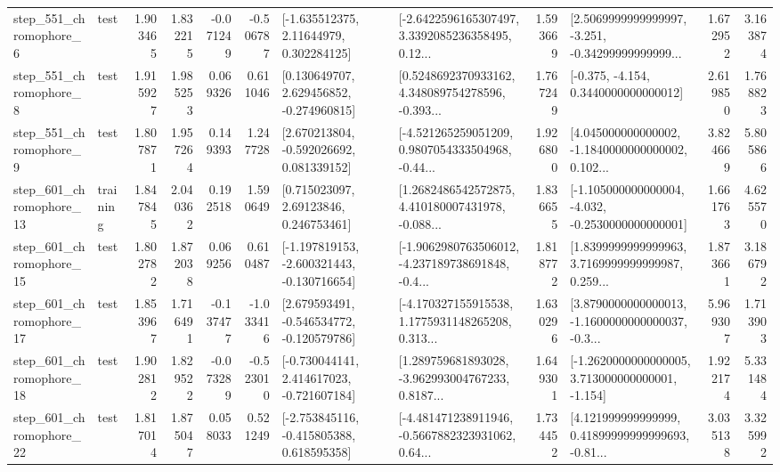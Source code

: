 \begin{tabular}{llrrrrllrlrr}
   step\_551\_chromophore\_6 &      test &      1.903465 &    1.832215 &     -0.071249 & -0.506787 &     [-1.635512375, 2.11644979, 0.302284125] &  [-2.6422596165307497, 3.3392085236358495, 0.12... &       1.593669 &  [2.5069999999999997, -3.251, -0.34299999999999... &            1.672952 &          3.163874 \\
   step\_551\_chromophore\_8 &      test &      1.915927 &    1.985253 &      0.069326 &  0.611046 &    [0.130649707, 2.629456852, -0.274960815] &  [0.5248692370933162, 4.348089754278596, -0.393... &       1.767249 &               [-0.375, -4.154, 0.3440000000000012] &            2.619850 &          1.768823 \\
   step\_551\_chromophore\_9 &      test &      1.807871 &    1.957264 &      0.149393 &  1.247728 &    [2.670213804, -0.592026692, 0.081339152] &  [-4.521265259051209, 0.9807054333504968, -0.44... &       1.926800 &  [4.045000000000002, -1.1840000000000002, 0.102... &            3.824669 &          5.805866 \\
  step\_601\_chromophore\_13 &  training &      1.847845 &    2.040362 &      0.192518 &  1.590649 &      [0.715023097, 2.69123846, 0.246753461] &  [1.2682486542572875, 4.410180007431978, -0.088... &       1.836655 &  [-1.105000000000004, -4.032, -0.2530000000000001] &            1.661763 &          4.625570 \\
  step\_601\_chromophore\_15 &      test &      1.802782 &    1.872038 &      0.069256 &  0.610487 &  [-1.197819153, -2.600321443, -0.130716654] &  [-1.9062980763506012, -4.237189738691848, -0.4... &       1.818772 &  [1.8399999999999963, 3.7169999999999987, 0.259... &            1.873661 &          3.186792 \\
  step\_601\_chromophore\_17 &      test &      1.853967 &    1.716491 &     -0.137477 & -1.033416 &   [2.679593491, -0.546534772, -0.120579786] &  [-4.170327155915538, 1.1775931148265208, 0.313... &       1.630296 &  [3.8790000000000013, -1.1600000000000037, -0.3... &            5.969307 &          1.713903 \\
  step\_601\_chromophore\_18 &      test &      1.902812 &    1.829522 &     -0.073289 & -0.523010 &   [-0.730044141, 2.414617023, -0.721607184] &  [1.289759681893028, -3.962993004767233, 0.8187... &       1.649301 &   [-1.2620000000000005, 3.713000000000001, -1.154] &            1.922174 &          5.331484 \\
  step\_601\_chromophore\_22 &      test &      1.817014 &    1.875047 &      0.058033 &  0.521249 &   [-2.753845116, -0.415805388, 0.618595358] &  [-4.481471238911946, -0.5667882323931062, 0.64... &       1.734452 &  [4.121999999999999, 0.41899999999999693, -0.81... &            3.035138 &          3.325992 \\

\end{tabular}
